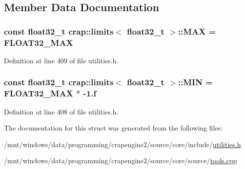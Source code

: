 \subsection{Member Data Documentation}
\hypertarget{structcrap_1_1limits_3_01float32__t_01_4_a8487cda6ada7d746f8c0318dfd2fd046}{
\subsubsection[{M\+A\+X}]{\setlength{\rightskip}{0pt plus 5cm}const {\bf float32\+\_\+t} {\bf crap\+::limits}$<$ {\bf float32\+\_\+t} $>$\+::M\+A\+X = {\bf F\+L\+O\+A\+T32\+\_\+\+M\+A\+X}\hspace{0.3cm}{\ttfamily [static]}}}\label{structcrap_1_1limits_3_01float32__t_01_4_a8487cda6ada7d746f8c0318dfd2fd046}


Definition at line 409 of file utilities.\+h.

\hypertarget{structcrap_1_1limits_3_01float32__t_01_4_a601378b6b1aa2281bda5e62d6737d4cf}{
\subsubsection[{M\+I\+N}]{\setlength{\rightskip}{0pt plus 5cm}const {\bf float32\+\_\+t} {\bf crap\+::limits}$<$ {\bf float32\+\_\+t} $>$\+::M\+I\+N = {\bf F\+L\+O\+A\+T32\+\_\+\+M\+A\+X} $\ast$ -\/1.f\hspace{0.3cm}{\ttfamily [static]}}}\label{structcrap_1_1limits_3_01float32__t_01_4_a601378b6b1aa2281bda5e62d6737d4cf}


Definition at line 408 of file utilities.\+h.



The documentation for this struct was generated from the following files\+:\begin{DoxyCompactItemize}
\item 
/mnt/windows/data/programming/crapengine2/source/core/include/\hyperlink{utilities_8h}{utilities.\+h}\item 
/mnt/windows/data/programming/crapengine2/source/core/source/\hyperlink{tools_8cpp}{tools.\+cpp}\end{DoxyCompactItemize}
